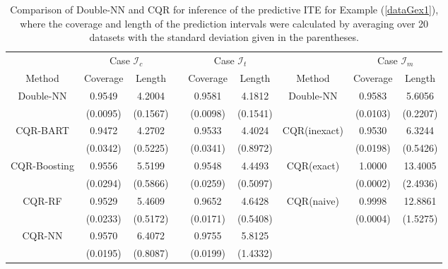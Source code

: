 \documentclass[11pt]{article}
\begin{document}
 
\begin{table}[!h]
\caption{
Comparison of  Double-NN and CQR for inference of the predictive 
ITE for Example (\ref{dataGex1}), where the coverage and length of the prediction intervals were calculated by averaging over 20 datasets with the standard deviation given in the parentheses. 
}
\vspace{-0.15in}
\label{case1compar}
\begin{center}
\begin{adjustbox}{width=1.0\textwidth}
\begin{tabular}{ccccccccc} \toprule
     & \multicolumn{2}{c}{Case $\mathcal{I}_c$} & & \multicolumn{2}{c}{Case $\mathcal{I}_t$} 
     &  & \multicolumn{2}{c}{Case $\mathcal{I}_m$}\\ \cline{2-3} \cline{5-6} \cline{8-9}
 Method &  Coverage & Length & & Coverage & Length & Method & Coverage & Length \\ \midrule
  \multirow{2}{*}{Double-NN}  & 0.9549 & 4.2004 & &  0.9581 & 4.1812 & 
  \multirow{2}{*}{Double-NN}  &0.9583 & 5.6056\\
  & (0.0095) & (0.1567) & &  (0.0098)  & (0.1541) &   & (0.0103) & (0.2207)\\
  \multirow{2}{*}{CQR-BART}     &  0.9472 & 4.2702 & & 0.9533 & 4.4024 & \multirow{2}{*}{CQR(inexact)} & 0.9530 & 6.3244\\
 &  (0.0342) & (0.5225) & & (0.0341) & (0.8972) & & (0.0198) & (0.5426)\\
 \multirow{2}{*}{CQR-Boosting} & 0.9556 & 5.5199 & & 0.9548 & 4.4493& 
 \multirow{2}{*}{CQR(exact)}  & 1.0000 & 13.4005\\
  & (0.0294) & (0.5866) & & (0.0259) & (0.5097) &  & (0.0002) & (2.4936) \\
 \multirow{2}{*}{CQR-RF} &  0.9529 & 5.4609 & & 0.9652 & 4.6428 & \multirow{2}{*}{CQR(naive)} & 0.9998  & 12.8861\\ 
  &   (0.0233) & (0.5172) & & (0.0171) & (0.5408) &  & (0.0004) & (1.5275)\\ 
 \multirow{2}{*}{CQR-NN} &  0.9570 & 6.4072
 & & 0.9755 & 5.8125 & \\ 
  &  (0.0195) & (0.8087) & & (0.0199) &  (1.4332) &  & \\ 

  \bottomrule
\end{tabular}
\end{adjustbox}
\end{center}
\end{table}
\end{document}
